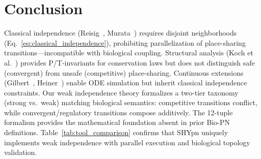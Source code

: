 \documentclass[twocolumn,11pt]{article}
\begin{document}
\section{Conclusion}

Classical independence (Reisig~\cite{Reisig2013}, Murata~\cite{Murata1989}) requires disjoint neighborhoods (Eq.~\ref{eq:classical_independence}), prohibiting parallelization of place-sharing transitions---incompatible with biological coupling. Structural analysis (Koch et al.~\cite{Koch2011}) provides P/T-invariants for conservation laws but does not distinguish safe (convergent) from unsafe (competitive) place-sharing. Continuous extensions (Gilbert~\cite{Gilbert2006}, Heiner~\cite{Heiner2008}) enable ODE simulation but inherit classical independence constraints. Our weak independence theory formalizes a two-tier taxonomy (strong vs.\ weak) matching biological semantics: competitive transitions conflict, while convergent/regulatory transitions compose additively. The 12-tuple formalism provides the mathematical foundation absent in prior Bio-PN definitions. Table~\ref{tab:tool_comparison} confirms that SHYpn uniquely implements weak independence with parallel execution and biological topology validation.



\end{document}
